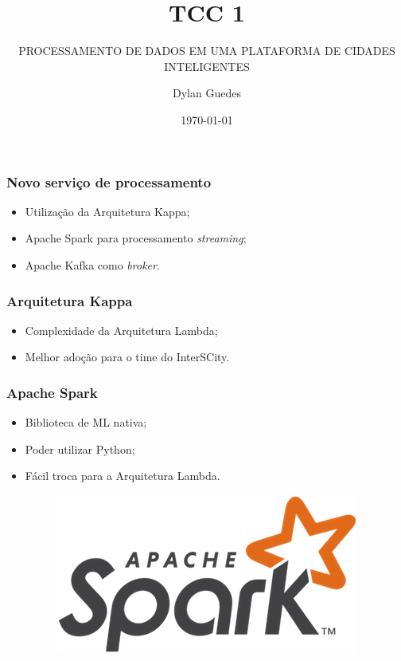 \documentclass{beamer}
\title{TCC 1}
\subtitle{PROCESSAMENTO DE DADOS EM UMA PLATAFORMA DE CIDADES INTELIGENTES}
\author{Dylan Guedes}
\institute{UnB Gama}
\date{\today}
\begin{document}
  
  
  
  
  
  
  
  
  
  
  

  \begin{frame}
      \frametitle{Novo serviço de processamento}
      \begin{itemize}
          \item Utilização da Arquitetura Kappa;
          \item Apache Spark para processamento \textit{streaming};
          \item Apache Kafka como \textit{broker}.
      \end{itemize}
  \end{frame}

  \begin{frame}
      \frametitle{Arquitetura Kappa}
      \begin{itemize}
          \item Complexidade da Arquitetura Lambda;
          \item Melhor adoção para o time do InterSCity.
      \end{itemize}
  \end{frame}

  \begin{frame}
      \frametitle{Apache Spark}
      \begin{itemize}
          \item Biblioteca de ML nativa;
          \item Poder utilizar Python;
          \item Fácil troca para a Arquitetura Lambda.
              \begin{figure}
                  \includegraphics[scale=0.3]{figures/spark_logo.png}
              \end{figure}
      \end{itemize}
  \end{frame}
\end{document}
